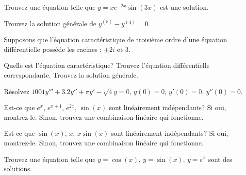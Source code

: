 \begin{exercise}
Trouvez une équation telle que  $y=xe^{-2x}\sin(3x)$ est une solution.
\end{exercise}

\setcounter{exercise}{100}

\begin{exercise}
Trouvez la solution générale de $y^{(5)}-y^{(4)}=0$.
\end{exercise}

\begin{exercise}
\pagebreak[2]
Supposons que l'équation caractéristique de troisième ordre d'une équation différentielle possède les racines : $\pm 2i$ et 3.
\begin{tasks}
\task
Quelle est l'équation caractéristique?
\task
Trouvez l'équation différentielle correspondante. 
\task
Trouvez la solution générale.
\end{tasks}
\end{exercise}

\begin{exercise}
Résolvez $1001y'''+3.2y''+\pi y'-\sqrt{4} y = 0$, $y(0)=0$, $y'(0) = 0$,
$y''(0) = 0$.
\end{exercise}

\begin{exercise}
Est-ce que  $e^{x}$, $e^{x+1}$, $e^{2x}$, $\sin(x)$ sont linéairement indépendants?  Si oui, montrez-le. Sinon, trouvez une combinaison linéaire qui fonctionne. 
\end{exercise}

\begin{exercise}
Est-ce que   $\sin(x)$, $x$, $x\sin(x)$ sont linéairement indépendants?  Si oui, montrez-le. Sinon, trouvez une combinaison linéaire qui fonctionne. 
\end{exercise}

\begin{exercise}
Trouvez une équation telle que $y=\cos(x)$, $y=\sin(x)$, $y=e^x$ sont des solutions.
\end{exercise}




